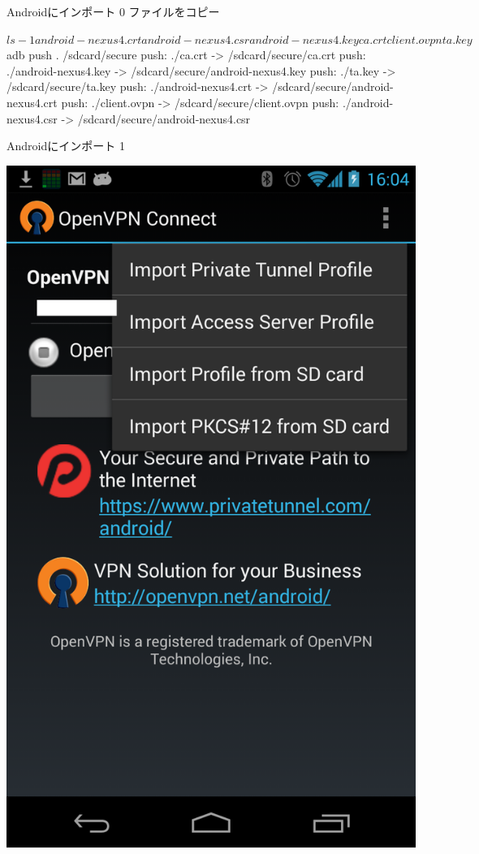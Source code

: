 \begin{frame}[containsverbatim]{Androidにインポート 0}
ファイルをコピー
\begin{commandline}
$ ls -1 
android-nexus4.crt
android-nexus4.csr
android-nexus4.key
ca.crt
client.ovpn
ta.key
$ adb push . /sdcard/secure
push: ./ca.crt -> /sdcard/secure/ca.crt
push: ./android-nexus4.key -> /sdcard/secure/android-nexus4.key
push: ./ta.key -> /sdcard/secure/ta.key
push: ./android-nexus4.crt -> /sdcard/secure/android-nexus4.crt
push: ./client.ovpn -> /sdcard/secure/client.ovpn
push: ./android-nexus4.csr -> /sdcard/secure/android-nexus4.csr
\end{commandline}
\end{frame}

\begin{frame}{Androidにインポート 1}

\includegraphics[height=0.9\vsize,bb=0 0 768 1280]{image201308/Screenshot_2013-08-17-16-04-31.png}

\end{frame}
